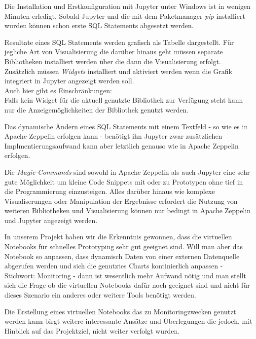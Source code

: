 Die Installation und Erstkonfiguration mit Jupyter unter Windows ist in wenigen Minuten erledigt.
Sobald Jupyter und die  mit dem Paketmanager \textit{pip} installiert wurden können
schon erste \ac{SQL} Statements abgesetzt werden.

Resultate eines \ac{SQL} Statements werden grafisch als Tabelle dargestellt.
Für jegliche Art von Visualisierung die darüber hinaus geht müssen separate Bibliotheken installiert werden
über die dann die Visualisierung erfolgt.
Zusätzlich müssen \textit{Widgets} installiert und aktiviert werden wenn die Grafik integriert in Jupyter angezeigt werden soll.\\
Auch hier gibt es Einschränkungen:\\
Falls kein Widget für die aktuell genutzte Bibliothek zur Verfügung steht kann nur die Anzeigemöglichkeiten der Bibliothek genutzt werden.

Das dynamische Ändern eines \ac{SQL} Statements mit einem Textfeld - so wie es in Apache Zeppelin erfolgen kann - benötigt ihn Jupyter zwar zusätzlichen Implmentierungsaufwand kann aber letztlich genauso wie in Apache Zeppelin erfolgen.

Die \textit{Magic-Commands} sind sowohl in Apache Zeppelin als auch Jupyter eine sehr gute Möglichkeit um kleine Code Snippets mit  oder  zu Prototypen ohne tief in die Programmierung einzusteigen.
Alles darüber hinaus wie komplexe Visualiserungen oder Manipulation der Ergebnisse erfordert die Nutzung von weiteren Bibliotheken und
Visualisierung können nur bedingt in Apache Zeppelin und Jupyter angezeigt werden.

In unserem Projekt haben wir die Erkenntnis gewonnen, dass die virtuellen Notebooks für schnelles Prototyping sehr gut geeignet sind.
Will man aber das Notebook so anpassen, dass \zb{} dynamisch Daten von einer externen Datenquelle abgerufen werden
und sich die genutztes Charts kontinierlich anpassen - Stichwort: Monitoring - dann ist wesentlich mehr Aufwand nötig und man stellt sich die
Frage ob die virtuellen Notebooks dafür noch geeignet sind und nicht für dieses Szenario ein anderes oder weitere Tools benötigt werden.

Die Erstellung eines virtuellen Notebooks das zu Monitoringzwecken genutzt werden kann birgt weitere interessante Ansätze und Überlegungen die
jedoch, mit Hinblick auf das Projektziel, nicht weiter verfolgt wurden.
